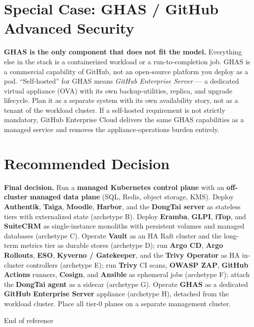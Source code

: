 \documentclass[10pt,letterpaper]{article}
\newcommand{\tool}[1]{\textbf{#1}}
\begin{document}
\section{Special Case: GHAS / GitHub Advanced Security}

\begin{warningbox}
\textbf{GHAS is the only component that does not fit the model.} Everything else in the stack is a containerized workload or a run-to-completion job. GHAS is a commercial capability of GitHub, not an open-source platform you deploy as a pod. ``Self-hosted'' for GHAS means \emph{GitHub Enterprise Server} --- a dedicated virtual appliance (OVA) with its own backup-utilities, replica, and upgrade lifecycle. Plan it as a separate system with its own availability story, not as a tenant of the workload cluster. If a self-hosted requirement is not strictly mandatory, GitHub Enterprise Cloud delivers the same GHAS capabilities as a managed service and removes the appliance-operations burden entirely.
\end{warningbox}

\section{Recommended Decision}

\begin{riskbox}
\textbf{Final decision.} Run a \tool{managed Kubernetes control plane} with an \tool{off-cluster managed data plane} (SQL, Redis, object storage, KMS). Deploy \tool{Authentik}, \tool{Taiga}, \tool{Moodle}, \tool{Harbor}, and the \tool{DongTai server} as stateless tiers with externalized state (archetype B). Deploy \tool{Eramba}, \tool{GLPI}, \tool{iTop}, and \tool{SuiteCRM} as single-instance monoliths with persistent volumes and managed databases (archetype C). Operate \tool{Vault} as an HA Raft cluster and the long-term metrics tier as durable stores (archetype D); run \tool{Argo CD}, \tool{Argo Rollouts}, \tool{ESO}, \tool{Kyverno / Gatekeeper}, and the \tool{Trivy Operator} as HA in-cluster controllers (archetype E); run \tool{Trivy} CI scans, \tool{OWASP ZAP}, \tool{GitHub Actions} runners, \tool{Cosign}, and \tool{Ansible} as ephemeral jobs (archetype F); attach the \tool{DongTai agent} as a sidecar (archetype G). Operate \tool{GHAS} as a dedicated \tool{GitHub Enterprise Server} appliance (archetype H), detached from the workload cluster. Place all tier-0 planes on a separate management cluster.
\end{riskbox}

\vfill
\begin{center}
{\sffamily\footnotesize\color{GrayText} End of reference}
\end{center}
\end{document}
